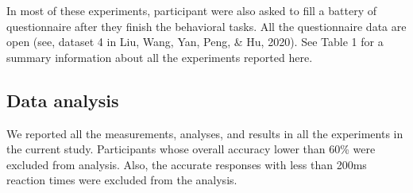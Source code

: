 \documentclass[
  man]{apa6}
\begin{document}
In most of these experiments, participant were also asked to fill a battery of questionnaire after they finish the behavioral tasks. All the questionnaire data are open (see, dataset 4 in Liu, Wang, Yan, Peng, \& Hu, 2020). See Table 1 for a summary information about all the experiments reported here.

\hypertarget{data-analysis}{%
\subsection{Data analysis}\label{data-analysis}}

We reported all the measurements, analyses, and results in all the experiments in the current study. Participants whose overall accuracy lower than 60\% were excluded from analysis. Also, the accurate responses with less than 200ms reaction times were excluded from the analysis.
\end{document}
